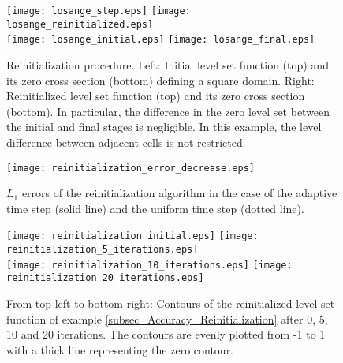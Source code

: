 \documentclass[english]{article}
\begin{document}
\begin{figure}[t]
\centering
\texttt{[image: losange\_step.eps]}
\texttt{[image: losange\_reinitialized.eps]}
\\
\texttt{[image: losange\_initial.eps]}
\texttt{[image: losange\_final.eps]}
\caption{Reinitialization procedure. Left: Initial level set function (top)
and its zero cross section (bottom) defining a square domain. Right:
Reinitialized level set function (top) and its zero cross section (bottom).
In particular, the difference in the zero level set between the initial and
final stages is negligible. In this example, the level difference between
adjacent cells is not restricted.} \label{fig_ex_reinitialization_square}
\end{figure}

\begin{figure}
\begin{center}
\texttt{[image: reinitialization\_error\_decrease.eps]}
\end{center}
\caption{$L_1$ errors of the reinitialization algorithm in the case of the
adaptive time step (solid line) and the uniform time step (dotted line).}
\label{fig_reinitialization_error_decay}
\end{figure}

\begin{figure}
\begin{center}
\texttt{[image: reinitialization\_initial.eps]}
\texttt{[image: reinitialization\_5\_iterations.eps]} \\
\texttt{[image: reinitialization\_10\_iterations.eps]}
\texttt{[image: reinitialization\_20\_iterations.eps]}
\end{center}
\caption{From top-left to bottom-right: Contours of the reinitialized level
set function of example \ref{subsec_Accuracy_Reinitialization} after 0, 5,
10 and 20 iterations. The contours are evenly plotted from -1 to 1 with a
thick line representing the zero contour.} \label{fig_reinitialization}
\end{figure}
\end{document}
